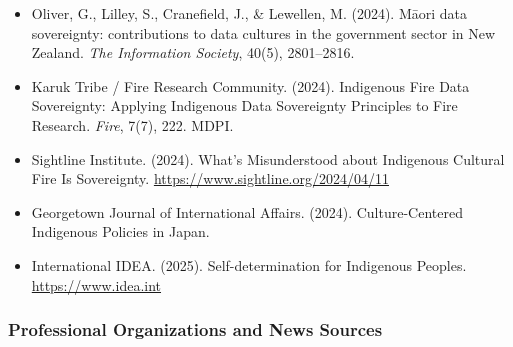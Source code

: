 \documentclass[11pt,letterpaper]{article}
\begin{document}
\begin{itemize}
  \item Oliver, G., Lilley, S., Cranefield, J., \& Lewellen, M. (2024). Māori data sovereignty: contributions to data cultures in the government sector in New Zealand. \textit{The Information Society}, 40(5), 2801--2816.
  \item Karuk Tribe / Fire Research Community. (2024). Indigenous Fire Data Sovereignty: Applying Indigenous Data Sovereignty Principles to Fire Research. \textit{Fire}, 7(7), 222. MDPI.
  \item Sightline Institute. (2024). What's Misunderstood about Indigenous Cultural Fire Is Sovereignty. \url{https://www.sightline.org/2024/04/11}
  \item Georgetown Journal of International Affairs. (2024). Culture-Centered Indigenous Policies in Japan.
  \item International IDEA. (2025). Self-determination for Indigenous Peoples. \url{https://www.idea.int}
\end{itemize}

\subsubsection{Professional Organizations and News Sources}
\end{document}

